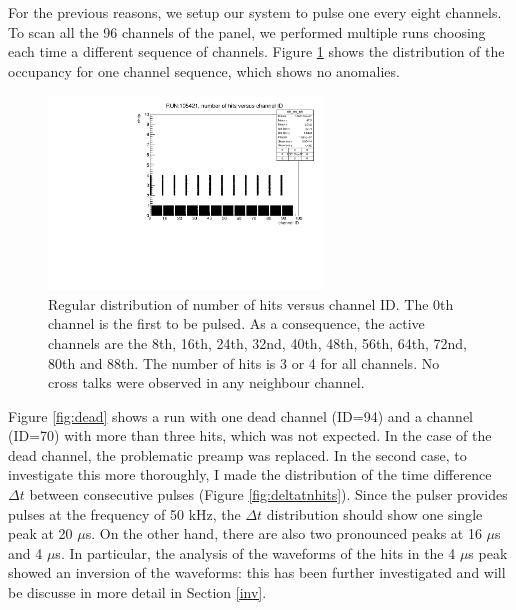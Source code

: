 For the previous reasons, we setup our system 
to pulse one every eight channels.
To scan all the 96 channels of the panel, 
we performed multiple runs choosing each time 
a different sequence of channels.
Figure \ref{fig:normalhits} shows the 
distribution of the occupancy for one channel 
sequence, which shows no anomalies.
\begin{figure}[!h]
      \centering
      \includegraphics[width=0.65\textwidth]{figures/pdf/run105421_nh_vs_ch.pdf}
      \caption[The regular occupancy plot.]{Regular distribution of number of hits versus channel ID. 
      The 0th channel is the first to be pulsed.
      As a consequence, the active channels are the 8th, 16th, 24th, 
      32nd, 40th, 48th, 56th, 64th, 72nd, 80th and 88th. 
      The number of hits is 3 or 4 for all channels. 
      No cross talks were observed in any neighbour channel.}
     \label{fig:normalhits}
\end{figure}
Figure \ref{fig:dead} shows a run with one dead channel (ID=94) 
and a channel (ID=70) with more than 
three hits, which was not expected. 
In the case of the dead channel, the problematic preamp 
was replaced. In the second case, to 
investigate this more thoroughly, 
I made the distribution of the time difference 
$\Delta t$ between consecutive pulses 
(Figure \ref{fig:deltatnhits}).
Since the pulser provides pulses at 
the frequency of 50 kHz, the $\Delta t$ 
distribution should show one single peak at 20 $\mu$s. 
On the other hand, there are also two 
pronounced peaks at 16 $\mu$s and 4 $\mu$s. 
In particular, the analysis of the 
waveforms of the hits in the 4 $\mu$s peak 
showed an inversion of the waveforms: 
this has been further investigated 
and will be discusse in more detail in Section \ref{inv}.
